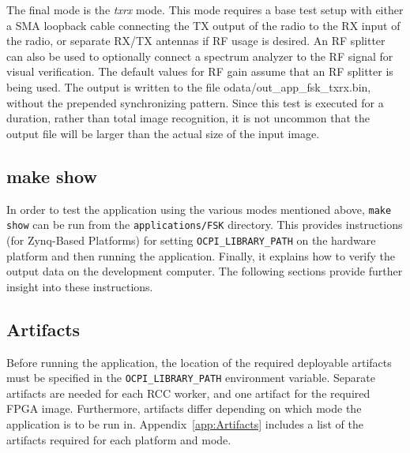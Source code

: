 \noindent The final mode is the \textit{txrx} mode. This mode requires a base test setup with either a SMA loopback cable connecting the TX output of the radio to the RX input of the radio, or separate RX/TX antennas if RF usage is desired. An RF splitter can also be used to optionally connect a spectrum analyzer to the RF signal for visual verification. The default values for RF gain assume that an RF splitter is being used. The output is written to the file odata/out\_app\_fsk\_txrx.bin, without the prepended synchronizing pattern. Since this test is executed for a duration, rather than total image recognition, it is not uncommon that the output file will be larger than the actual size of the input image.
\par\medskip
\subsection{make show}
In order to test the application using the various modes mentioned above, \texttt{make show} can be run from the \texttt{applications/FSK} directory. This provides instructions (for Zynq-Based Platforms) for setting \texttt{OCPI\_LIBRARY\_PATH} on the hardware platform and then running the application. Finally, it explains how to verify the output data on the development computer. The following sections provide further insight into these instructions.
\subsection{Artifacts}
Before running the application, the location of the required deployable artifacts must be specified in the \texttt{OCPI\_LIBRARY\_PATH} environment variable. Separate artifacts are needed for each RCC worker, and one artifact for the required FPGA image. Furthermore, artifacts differ depending on which mode the application is to be run in. Appendix~\ref{app:Artifacts} includes a list of the artifacts required for each platform and mode.
